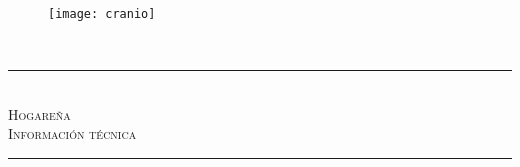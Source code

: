 \documentclass[a4paper]{article}
\newcommand{\HRule}{\rule{\linewidth}{0.5mm}}
\numberwithin{equation}{section}
\numberwithin{figure}{section}
\begin{document}
\begin{titlepage}
\begin{center}
\begin{figure}[H]\label{cranio}
\centering
\texttt{[image: cranio]}
\end{figure}
\begin{minipage}[t]{0.5\textwidth}
\begin{flushright} 


  \huge
\LARGE  \ \\[3.8cm]
\noindent

\noindent
\end{flushright}
\end{minipage}
\HRule \\[1cm]
\noindent
\textsc{\LARGE Hogareña}\\[1.5cm]
\textsc{\Large  Información técnica}\\[0.7cm]
\HRule \\[1cm]
\noindent

\vfill
\end{center}
\end{titlepage}

\tableofcontents

\pagebreak
\end{document}
